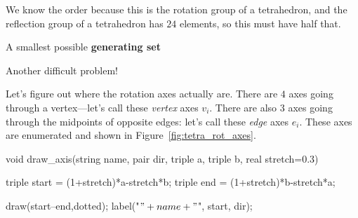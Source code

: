 \documentclass[../gatm_answers.tex]{subfiles}
\begin{document}
\noindent We know the order because this is the rotation group of a tetrahedron, and the reflection group of a tetrahedron has $24$ elements, so this must have half that.

\begin{inner_problem}
\item A smallest possible \textbf{generating set}
\end{inner_problem}

\noindent Another difficult problem!

Let's figure out where the rotation axes actually are. There are $4$ axes going through a vertex---let's call these \textit{vertex} axes $v_i$. There are also $3$ axes going through the midpoints of opposite edges: let's call these \textit{edge} axes $e_i$. These axes are enumerated and shown in Figure~\ref{fig:tetra_rot_axes}.

\begin{asydef}
void draw_axis(string name, pair dir, triple a, triple b, real stretch=0.3) {
	triple start = (1+stretch)*a-stretch*b;
	triple end = (1+stretch)*b-stretch*a;

	draw(start--end,dotted);
	label("$" + name + "$", start, dir);
}
\end{asydef}
\end{document}

